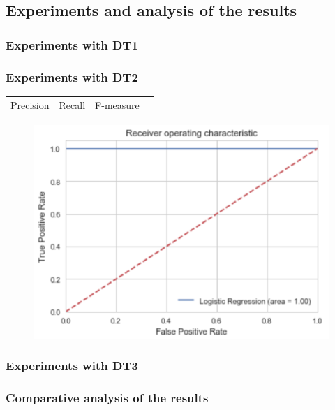 \subsection{Experiments and analysis of the results}


\subsubsection{Experiments with DT1}
\subsubsection{Experiments with DT2}


\begin{table}[h]
\centering
\begin{tabular}{cccc}
Precision & Recall & F-measure & \\
\end{tabular}
\end{table}

\begin{figure}
\includegraphics[width=.8\textwidth]{images/curve_roc_dt2}
\end{figure}
\subsubsection{Experiments with DT3}
\subsubsection{Comparative analysis of the results}
